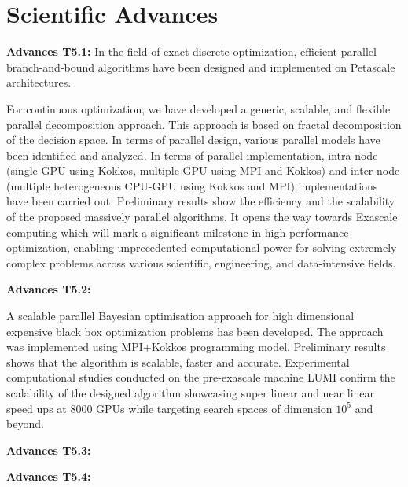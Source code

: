 \section{Scientific Advances}
  
{\bf Advances T5.1:}
In the field of exact discrete optimization, efficient parallel branch-and-bound algorithms have been designed and implemented on Petascale architectures. 

\medskip

For continuous optimization, we have developed a generic, scalable, and flexible parallel decomposition approach. This approach is based on fractal decomposition of the decision space. In terms of parallel design, various parallel models have been identified and analyzed. In terms of parallel implementation, intra-node (single GPU using Kokkos, multiple GPU using MPI and Kokkos) and inter-node (multiple heterogeneous CPU-GPU using Kokkos and MPI) implementations have been carried out. Preliminary results show the efficiency and the scalability of the proposed massively parallel algorithms. It opens the way towards Exascale computing which will mark a significant milestone in high-performance optimization, enabling unprecedented computational power for solving extremely complex problems across various scientific, engineering, and data-intensive fields.

\medskip

{\bf Advances T5.2:} 

A scalable parallel Bayesian optimisation approach for high dimensional expensive black box optimization problems has been developed. The approach was implemented using MPI+Kokkos programming model. Preliminary results shows that the algorithm is scalable, faster and  accurate. Experimental computational studies conducted on the pre-exascale machine LUMI  confirm the scalability of the designed algorithm showcasing super linear and near linear speed ups at 8000 GPUs while targeting search spaces of dimension $10^5$ and beyond.

\medskip

{\bf Advances T5.3:}

\medskip

{\bf Advances T5.4:}


